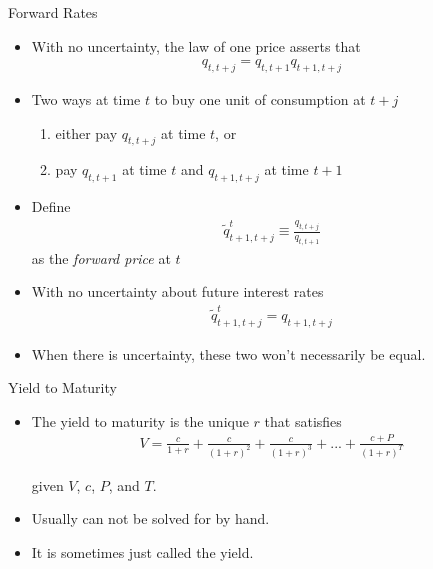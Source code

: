 \documentclass[professionalfonts,small]{beamer}
\begin{document}
\begin{frame}{Forward Rates}
\footnotesize

\begin{itemize}

\item With no uncertainty, the law of one price asserts that
\begin{eqnarray*}
q_{t,t+j} = q_{t,t+1} q_{t+1,t+j}
\end{eqnarray*}

\medskip

\item Two ways at time $t$ to buy one unit of consumption at $t+j$
\begin{enumerate}
\footnotesize
\item either pay $q_{t,t+j}$ at time $t$, or
\item pay $q_{t,t+1}$ at time $t$ and $q_{t+1,t+j}$ at time $t+1$
\end{enumerate}

\medskip

\item Define
\begin{eqnarray*}
\tilde{q}^t_{t+1,t+j} \equiv \frac{q_{t,t+j}}{q_{t,t+1}}
\end{eqnarray*}
as the {\em forward price} at $t$


\item With no uncertainty about future interest rates
\begin{eqnarray*}
\tilde{q}^t_{t+1,t+j} = q_{t+1,t+j}
\end{eqnarray*}


\item When there is uncertainty, these two won't necessarily be equal.

\end{itemize}

\end{frame}

\begin{frame}{Yield to Maturity}

\begin{itemize}

\item The yield to maturity is the unique $r$ that satisfies
\begin{eqnarray*}
V = \frac{c}{1+r}  + \frac{c}{(1+r)^2} + \frac{c}{(1+r)^3} + ... + \frac{c+P}{(1+r)^T}
\end{eqnarray*}

given $V$, $c$, $P$, and $T$.

\bigskip

\item Usually can not be solved for by hand.

\bigskip

\item It is sometimes just called the yield.

\end{itemize}

\end{frame}
\end{document}
